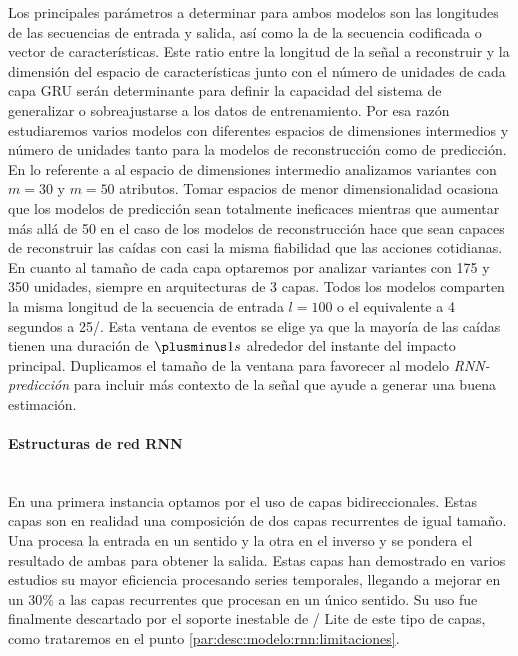 Los principales parámetros a determinar para ambos modelos son las longitudes de las secuencias de entrada y salida, así como la de la secuencia codificada o vector de características. Este ratio entre la longitud de la señal a reconstruir y la dimensión del espacio de características junto con el número de unidades de cada capa GRU serán determinante para definir la capacidad del sistema de generalizar o sobreajustarse a los datos de entrenamiento. Por esa razón estudiaremos varios modelos con diferentes espacios de dimensiones intermedios y número de unidades tanto para la modelos de reconstrucción como de predicción. En lo referente a al espacio de dimensiones intermedio analizamos variantes con $m=30$ y $m=50$ atributos. Tomar espacios de menor dimensionalidad ocasiona que los modelos de predicción sean totalmente ineficaces mientras que aumentar más allá de 50 en el caso de los modelos de reconstrucción hace que sean capaces de reconstruir las caídas con casi la misma fiabilidad que las acciones cotidianas. En cuanto al tamaño de cada capa optaremos por analizar variantes con 175 y 350 unidades, siempre en arquitecturas de 3 capas. Todos los modelos comparten la misma longitud de la secuencia de entrada $l=100$ o el equivalente a 4 segundos a 25\hz/. Esta ventana de eventos se elige ya que la mayoría de las caídas tienen una duración de $\plusminus1s$ \cite{Sucerquia2017,Liu2018,Hassan2019} alrededor del instante del impacto principal. Duplicamos el tamaño de la ventana para favorecer al modelo \textit{RNN-predicción} para incluir más contexto de la señal que ayude a generar una buena estimación.

\paragraph{Estructuras de red RNN}\\
En una primera instancia optamos por el uso de capas bidireccionales\cite{Schuster1997}. Estas capas son en realidad una composición de dos capas recurrentes de igual tamaño. Una procesa la entrada en un sentido y la otra en el inverso y se pondera el resultado de ambas para obtener la salida. Estas capas han demostrado en varios estudios \cite{Zhao2017, Su2018} su mayor eficiencia procesando series temporales, llegando a mejorar en un 30\% a las capas recurrentes que procesan en un único sentido. Su uso fue finalmente descartado por el soporte inestable de \tensorflow/ Lite de este tipo de capas, como trataremos en el punto \ref{par:desc:modelo:rnn:limitaciones}.

